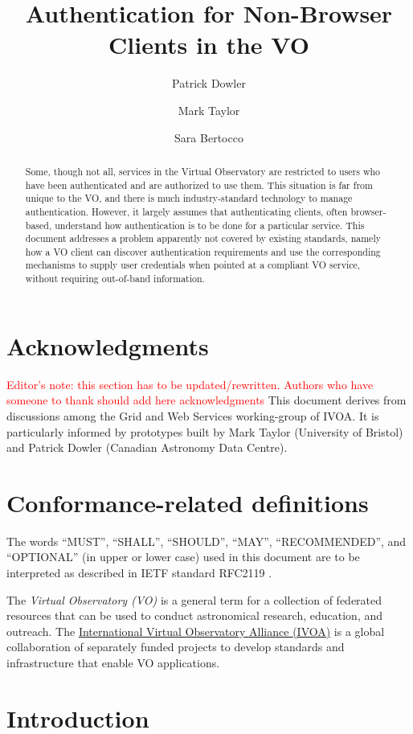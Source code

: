 \documentclass[11pt,a4paper]{ivoa}
\title{Authentication for Non-Browser Clients in the VO}
\author{Patrick Dowler}
\author{Mark Taylor}
\author{Sara Bertocco}
\begin{document}
\begin{abstract}
Some, though not all, services in the Virtual Observatory are
restricted to users who have been authenticated and are authorized to use them.
This situation is far from unique to the VO,
and there is much industry-standard technology to manage authentication.
However, it largely assumes that authenticating clients,
often browser-based, understand how authentication is to be done
for a particular service.
This document addresses a problem apparently not covered
by existing standards, namely how a VO client can discover
authentication requirements and use the corresponding mechanisms
to supply user credentials
when pointed at a compliant VO service, without requiring out-of-band
information.
\end{abstract}


\section*{Acknowledgments}

\textcolor{red}{Editor's note: this section has to be
updated/rewritten. Authors who have someone to thank should
add here acknowledgments}
This document derives from discussions among the Grid and Web Services
working-group of IVOA. It is particularly informed by prototypes built
by Mark Taylor (University of Bristol) and Patrick Dowler
(Canadian Astronomy Data Centre).


\section*{Conformance-related definitions}

The words ``MUST'', ``SHALL'', ``SHOULD'', ``MAY'', ``RECOMMENDED'', and
``OPTIONAL'' (in upper or lower case) used in this document are to be
interpreted as described in IETF standard RFC2119 \citep{std:RFC2119}.

The \emph{Virtual Observatory (VO)} is a
general term for a collection of federated resources that can be used
to conduct astronomical research, education, and outreach.
The \href{https://www.ivoa.net}{International
Virtual Observatory Alliance (IVOA)} is a global
collaboration of separately funded projects to develop standards and
infrastructure that enable VO applications.


\section{Introduction}
\end{document}

